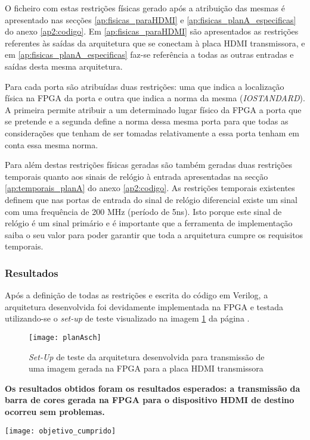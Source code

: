 O ficheiro com estas restrições físicas gerado após a atribuição das mesmas é apresentado nas secções \ref{ap:fisicas_paraHDMI} e \ref{ap:fisicas_planA_especificas} do anexo \ref{ap2:codigo}. Em  \ref{ap:fisicas_paraHDMI} são apresentados as restrições referentes às saídas da arquitetura que se conectam à placa HDMI transmissora, e em \ref{ap:fisicas_planA_especificas} faz-se referência a todas as outras entradas e saídas desta mesma arquitetura.

Para cada porta são atribuídas duas restrições: uma que indica a localização física na FPGA da porta e outra que indica a norma da mesma (\textit{IOSTANDARD}). A primeira permite atribuir a um determinado lugar físico da FPGA a porta que se pretende e a segunda define a norma dessa mesma porta para que todas as considerações que tenham de ser tomadas relativamente a essa porta tenham em conta essa mesma norma.

Para além destas restrições físicas geradas são também geradas duas restrições temporais quanto aos sinais de relógio à entrada apresentadas na secção \ref{ap:temporais_planA} do anexo \ref{ap2:codigo}. As restrições temporais existentes definem que nas portas de entrada do sinal de relógio diferencial existe um sinal com uma frequência de 200 MHz (período de 5ns). Isto porque este sinal de relógio é um sinal primário e é importante que a ferramenta de implementação saiba o seu valor para poder garantir que toda a arquitetura cumpre os requisitos temporais.

\subsubsection*{Resultados}

Após a definição de todas as restrições e escrita do código em Verilog, a arquitetura desenvolvida foi devidamente implementada na FPGA e testada utilizando-se o \textit{set-up} de teste visualizado na imagem \ref{fig:planA_sch} da página \pageref{fig:planA_sch}.

\begin{figure}[h!]
	\begin{center}
		\leavevmode
		\texttt{[image: planAsch]}
		\caption{\textit{Set-Up} de teste da arquitetura desenvolvida para transmissão de uma imagem gerada na FPGA para a placa HDMI transmissora}
		\label{fig:planA_sch}
	\end{center}
\end{figure}

\textbf{Os resultados obtidos foram os resultados esperados: a transmissão da barra de cores gerada na FPGA para o dispositivo HDMI de destino ocorreu sem problemas.}
\begin{marginfigure}
		\texttt{[image: objetivo\_cumprido]}
\end{marginfigure}

